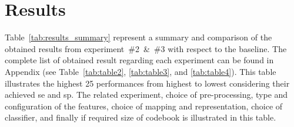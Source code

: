 
%
%

\section{Results}\label{sec:res}
Table~\ref{tab:results_summary} represent a summary and comparison of the obtained results from experiment~\#2~\&~\#3 with respect to the baseline.
The complete list of obtained result regarding each experiment can be found in Appendix (see Table~\ref{tab:table2}, \ref{tab:table3}, and \ref{tab:table4}).
This table illustrates the highest 25 performances from highest to lowest considering their achieved \ac{se} and \ac{sp}.
The related experiment, choice of pre-processing, type and configuration of the features, choice of mapping and representation, choice of classifier, and finally if required size of codebook is illustrated in this table.





